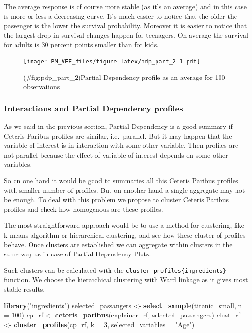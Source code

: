 \documentclass[]{krantz}
\newenvironment{Shaded}{\begin{snugshade}}{\end{snugshade}}
\newcommand{\DataTypeTok}[1]{\textcolor[rgb]{0.13,0.29,0.53}{#1}}
\newcommand{\DecValTok}[1]{\textcolor[rgb]{0.00,0.00,0.81}{#1}}
\newcommand{\KeywordTok}[1]{\textcolor[rgb]{0.13,0.29,0.53}{\textbf{#1}}}
\newcommand{\NormalTok}[1]{#1}
\newcommand{\StringTok}[1]{\textcolor[rgb]{0.31,0.60,0.02}{#1}}
\theoremstyle{definition}
\theoremstyle{definition}
\theoremstyle{definition}
\theoremstyle{remark}
\begin{document}
The average response is of course more stable (as it's an average) and
in this case is more or less a decreasing curve. It's much easier to
notice that the older the passenger is the lower the survival
probability. Moreover it is easier to notice that the largest drop in
survival changes happen for teenagers. On average the survival for
adults is 30 percent points smaller than for kids.

\begin{figure}
\centering
\texttt{[image: PM\_VEE\_files/figure-latex/pdp\_part\_2-1.pdf]}
\caption{(\#fig:pdp\_part\_2)Partial Dependency profile as an average
for 100 observations}
\end{figure}

\hypertarget{interactions-and-partial-dependency-profiles}{%
\subsubsection{Interactions and Partial Dependency
profiles}\label{interactions-and-partial-dependency-profiles}}

As we said in the previous section, Partial Dependency is a good summary
if Ceteris Paribus profiles are similar, i.e.~parallel. But it may
happen that the variable of interest is in interaction with some other
variable. Then profiles are not parallel because the effect of variable
of interest depends on some other variables.

So on one hand it would be good to summaries all this Ceteris Paribus
profiles with smaller number of profiles. But on another hand a single
aggregate may not be enough. To deal with this problem we propose to
cluster Ceteris Paribus profiles and check how homogenous are these
profiles.

The most straightforward approach would be to use a method for
clustering, like k-means algorithm or hierarchical clustering, and see
how these cluster of profiles behave. Once clusters are established we
can aggregate within clusters in the same way as in case of Partial
Dependency Plots.

Such clusters can be calculated with the
\texttt{cluster\_profiles\{ingredients\}} function. We choose the
hierarchical clustering with Ward linkage as it gives most stable
results.

\begin{Shaded}
\begin{Highlighting}[]
\KeywordTok{library}\NormalTok{(}\StringTok{"ingredients"}\NormalTok{)}
\NormalTok{selected_passangers <-}\StringTok{ }\KeywordTok{select_sample}\NormalTok{(titanic_small, }\DataTypeTok{n =} \DecValTok{100}\NormalTok{)}
\NormalTok{cp_rf <-}\StringTok{ }\KeywordTok{ceteris_paribus}\NormalTok{(explainer_rf, selected_passangers)}
\NormalTok{clust_rf <-}\StringTok{ }\KeywordTok{cluster_profiles}\NormalTok{(cp_rf, }\DataTypeTok{k =} \DecValTok{3}\NormalTok{, }\DataTypeTok{selected_variables =} \StringTok{"Age"}\NormalTok{)}
\end{Highlighting}
\end{Shaded}
\end{document}

